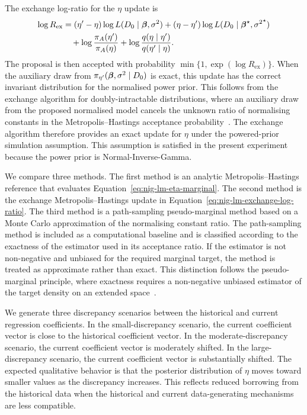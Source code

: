 The exchange log-ratio for the $\eta$ update is
\begin{align}
    \log R_{\mathrm{ex}}
    &=
    (\eta'-\eta)
    \log L(D_0 \mid \boldsymbol{\beta},\sigma^2)
    +
    (\eta-\eta')
    \log L(D_0 \mid {\boldsymbol{\beta}}^\star,{\sigma^2}^\star)
    \nonumber
    \\
    &\quad
    +
    \log \frac{\pi_A(\eta')}{\pi_A(\eta)}
    +
    \log \frac{q(\eta \mid \eta')}{q(\eta' \mid \eta)}.
    \label{eq:nig-lm-exchange-log-ratio}
\end{align}
The proposal is then accepted with probability $\min\{1,\exp(\log R_{\mathrm{ex}})\}$.
When the auxiliary draw from $\pi_{\eta'}(\boldsymbol{\beta},\sigma^2 \mid D_0)$ is exact, this update has the correct invariant distribution for the normalised power prior.
This follows from the exchange algorithm for doubly-intractable distributions, where an auxiliary draw from the proposed normalised model cancels the unknown ratio of normalising constants in the Metropolis--Hastings acceptance probability~\cite{murray2012}. 
The exchange algorithm therefore provides an exact update for $\eta$ under the powered-prior simulation assumption.
This assumption is satisfied in the present experiment because the power prior is Normal-Inverse-Gamma.

We compare three methods.
The first method is an analytic Metropolis--Hastings reference that evaluates Equation~\eqref{eq:nig-lm-eta-marginal}.
The second method is the exchange Metropolis--Hastings update in Equation~\eqref{eq:nig-lm-exchange-log-ratio}.
The third method is a path-sampling pseudo-marginal method based on a Monte Carlo approximation of the normalising constant ratio.
The path-sampling method is included as a computational baseline and is classified according to the exactness of the estimator used in its acceptance ratio.
If the estimator is not non-negative and unbiased for the required marginal target, the method is treated as approximate rather than exact.
This distinction follows the pseudo-marginal principle, where exactness requires a non-negative unbiased estimator of the target density on an extended space~\cite{andrieu2009}.

We generate three discrepancy scenarios between the historical and current regression coefficients.
In the small-discrepancy scenario, the current coefficient vector is close to the historical coefficient vector.
In the moderate-discrepancy scenario, the current coefficient vector is moderately shifted.
In the large-discrepancy scenario, the current coefficient vector is substantially shifted.
The expected qualitative behavior is that the posterior distribution of $\eta$ moves toward smaller values as the discrepancy increases.
This reflects reduced borrowing from the historical data when the historical and current data-generating mechanisms are less compatible.

